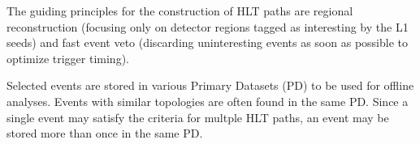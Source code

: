 The guiding principles for the construction of HLT paths are regional reconstruction (focusing only on detector regions tagged as interesting by the L1 seeds) and fast event veto (discarding uninteresting events as soon as possible to optimize trigger timing).

Selected events are stored in various Primary Datasets (PD) to be used for offline analyses.
Events with similar topologies are often found in the same PD.
Since a single event may satisfy the criteria for multple HLT paths, an event may be stored more than once in the same PD.
